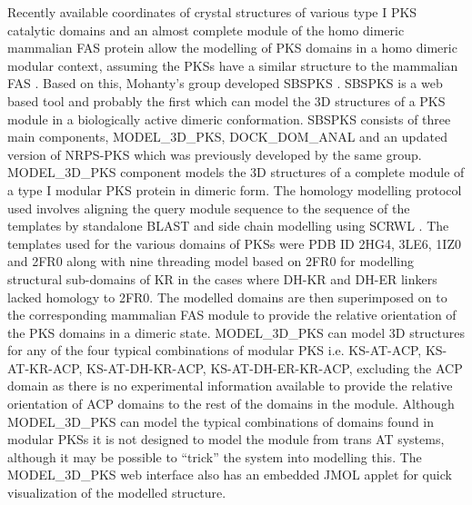 \begin{doublespacing}
		Recently available coordinates of crystal structures of various type I PKS catalytic domains \parencite{Keatinge-Clay2006, Khosla2007, Tang2007, Keatinge-Clay2008, Khosla2009, Tsai2009} and an almost complete module of the homo dimeric mammalian FAS protein \parencite{Maier2008} allow the modelling of PKS domains in a homo dimeric modular context, assuming the PKSs have a similar structure to the mammalian FAS \parencite{Gokhale2007, Tsai2009}. Based on this, Mohanty's group developed SBSPKS \parencite{Anand2010}. SBSPKS is a web based tool and probably the first which can model the 3D structures of a PKS module in a biologically active dimeric conformation. SBSPKS consists of three main components, MODEL\_3D\_PKS, DOCK\_DOM\_ANAL and an updated version of NRPS-PKS which was previously developed by the same group. MODEL\_3D\_PKS component models the 3D structures of a complete module of a type I modular PKS protein in dimeric form. The homology modelling protocol used involves aligning the query module sequence to the sequence of the templates by standalone BLAST and side chain modelling using SCRWL \parencite{Canutescu2003}. The templates used for the various domains of PKSs were PDB ID 2HG4, 3LE6, 1IZ0 and 2FR0 along with nine threading model based on 2FR0 for modelling structural sub-domains of KR in the cases where DH-KR and DH-ER linkers lacked homology to 2FR0. The modelled domains are then superimposed on to the corresponding mammalian FAS module to provide the relative orientation of the PKS domains in a dimeric state. MODEL\_3D\_PKS can model 3D structures for any of the four typical combinations of modular PKS i.e. KS-AT-ACP, KS-AT-KR-ACP, KS-AT-DH-KR-ACP, KS-AT-DH-ER-KR-ACP, excluding the ACP domain as there is no experimental information available to provide the relative orientation of ACP domains to the rest of the domains in the module. Although MODEL\_3D\_PKS can model the typical combinations of domains found in modular PKSs it is not designed to model the module from trans AT systems, although it may be possible to “trick” the system into modelling this. The MODEL\_3D\_PKS web interface also has an embedded JMOL applet for quick visualization of the modelled structure.
		

\end{doublespacing}

